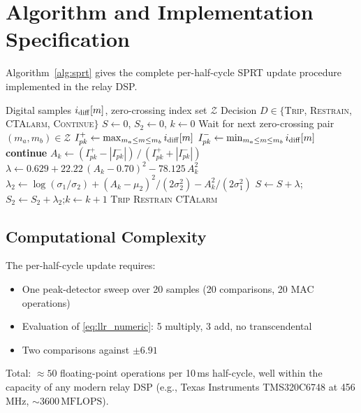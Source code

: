 \documentclass[11pt, a4paper]{article}
\begin{document}
\section{Algorithm and Implementation Specification}
\label{sec:algorithm}

Algorithm~\ref{alg:sprt} gives the complete per-half-cycle SPRT update
procedure implemented in the relay DSP.

\begin{algorithm}[!t]
\caption{Per-Half-Cycle SPRT Update (50\,Hz System, $f_s = 1$\,kHz)}
\label{alg:sprt}
\begin{algorithmic}[1]
\Require Digital samples $i_{\rm diff}[m]$, zero-crossing index set $\mathcal{Z}$
\Ensure Decision $D \in \{$\textsc{Trip}, \textsc{Restrain}, \textsc{CTAlarm}, \textsc{Continue}$\}$
\State $S \gets 0$, $S_2 \gets 0$, $k \gets 0$
  \State Wait for next zero-crossing pair $(m_a, m_b) \in \mathcal{Z}$
  \State $I^+_{pk} \gets \max_{m_a \leq m \leq m_b} i_{\rm diff}[m]$
  \State $I^-_{pk} \gets \min_{m_a \leq m \leq m_b} i_{\rm diff}[m]$
   \textbf{continue} \EndIf
  \State $A_k \gets (I^+_{pk} - |I^-_{pk}|)\,/\,(I^+_{pk} + |I^-_{pk}|)$
  \State $\lambda \gets 0.629 + 22.22\,(A_k - 0.70)^2 - 78.125\,A_k^2$
  \State $\lambda_2 \gets \log(\sigma_1/\sigma_2) + (A_k-\mu_2)^2/(2\sigma_2^2) - A_k^2/(2\sigma_1^2)$
  \State $S \gets S + \lambda$;\quad $S_2 \gets S_2 + \lambda_2$;\quad $k \gets k + 1$
   \Return \textsc{Trip} \EndIf
   \Return \textsc{Restrain} \EndIf
   \Return \textsc{CTAlarm} \EndIf
\EndWhile
\end{algorithmic}
\end{algorithm}

\subsection{Computational Complexity}

The per-half-cycle update requires:
\begin{itemize}
  \item One peak-detector sweep over 20 samples (20 comparisons, 20 MAC operations)
  \item Evaluation of \eqref{eq:llr_numeric}: 5 multiply, 3 add, no transcendental
  \item Two comparisons against $\pm 6.91$
\end{itemize}
Total: $\approx 50$ floating-point operations per 10\,ms half-cycle, well within
the capacity of any modern relay DSP (e.g., Texas Instruments TMS320C6748 at
456\,MHz, $\sim 3600\,\text{MFLOPS}$).
\end{document}
